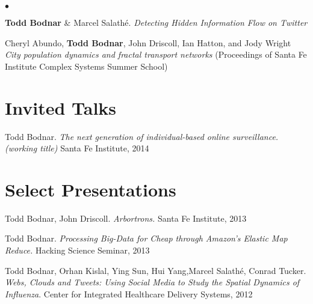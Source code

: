 \documentclass[margin,line]{res}
\newcommand{\linkToUrl}[1]{{\color{blue}\underline{\href{#1}{Link}}}}
\renewcommand{\linkToUrl}[1]{}
\newenvironment{list2}{
  \begin{list}{$\bullet$}{%
      \setlength{\itemsep}{0in}
      \setlength{\parsep}{0in} \setlength{\parskip}{0in}
      \setlength{\topsep}{0in} \setlength{\partopsep}{0in} 
      \setlength{\leftmargin}{10pt}}}{\end{list}}
\begin{document}
\begin{resume}
\begin{list2}
\item \textbf{Todd Bodnar} \& Marcel Salath\'e. \textit{Detecting Hidden Information Flow on Twitter} %
\item Cheryl Abundo, \textbf{Todd Bodnar}, John Driscoll, Ian Hatton, and Jody Wright
 \textit{City population dynamics and fractal transport networks} (Proceedings of Santa Fe Institute Complex Systems Summer School) \linkToUrl{bit.ly/19A22vY}%
\end{list2}

\section{\sc Invited Talks}
\begin{etaremune}[start=1,leftmargin=13pt]
\item Todd Bodnar. \textit{The next generation of individual-based online surveillance.(working title)} Santa Fe Institute, 2014
\end{etaremune}  

\section{\sc Select Presentations}
\begin{etaremune}[start=3,leftmargin=13pt]
\item Todd Bodnar, John Driscoll. \textit{Arbortrons.} Santa Fe Institute, 2013
\item Todd Bodnar. \textit{Processing Big-Data for Cheap through Amazon's Elastic Map Reduce.} Hacking Science Seminar, 2013
\item Todd Bodnar, Orhan Kislal, Ying Sun, Hui Yang,Marcel Salath\'e, Conrad 
Tucker. \textit{Webs, Clouds and Tweets: Using Social Media to Study the Spatial Dynamics of Influenza}. Center for Integrated Healthcare Delivery Systems, 2012 
\end{etaremune}



\end{resume}
\end{document}
